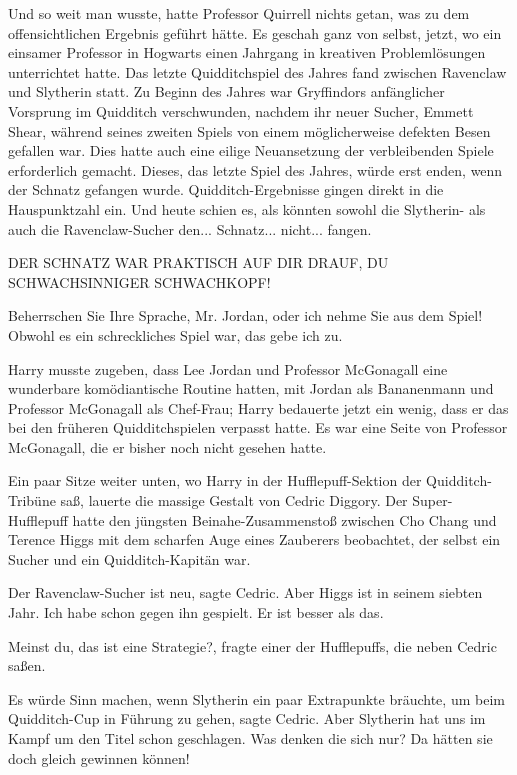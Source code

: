 Und so weit man wusste, hatte Professor Quirrell nichts getan, was zu dem
offensichtlichen Ergebnis geführt hätte. Es geschah ganz von selbst, jetzt, wo
ein einsamer Professor in Hogwarts einen Jahrgang in kreativen Problemlösungen
unterrichtet hatte. Das letzte Quidditchspiel des Jahres fand zwischen Ravenclaw
und Slytherin statt. Zu Beginn des Jahres war Gryffindors anfänglicher Vorsprung
im Quidditch verschwunden, nachdem ihr neuer Sucher, Emmett Shear, während
seines zweiten Spiels von einem möglicherweise defekten Besen gefallen war. Dies
hatte auch eine eilige Neuansetzung der verbleibenden Spiele erforderlich
gemacht. Dieses, das letzte Spiel des Jahres, würde erst enden, wenn der Schnatz
gefangen wurde. Quidditch-Ergebnisse gingen direkt in die Hauspunktzahl ein. Und
heute schien es, als könnten sowohl die Slytherin- als auch die Ravenclaw-Sucher
den... Schnatz... nicht... fangen.

\glqq{}DER SCHNATZ WAR PRAKTISCH AUF DIR DRAUF, DU SCHWACHSINNIGER SCHWACHKOPF!\grqq{}

\glqq{}Beherrschen Sie Ihre Sprache, Mr. Jordan, oder ich nehme Sie aus dem
Spiel! Obwohl es ein schreckliches Spiel war, das gebe ich zu.\grqq{}

Harry musste zugeben, dass Lee Jordan und Professor McGonagall eine wunderbare
komödiantische Routine hatten, mit Jordan als Bananenmann und Professor
McGonagall als Chef-Frau; Harry bedauerte jetzt ein wenig, dass er das bei den
früheren Quidditchspielen verpasst hatte. Es war eine Seite von Professor
McGonagall, die er bisher noch nicht gesehen hatte.

Ein paar Sitze weiter unten, wo Harry in der Hufflepuff-Sektion der
Quidditch-Tribüne saß, lauerte die massige Gestalt von Cedric Diggory. Der
Super-Hufflepuff hatte den jüngsten Beinahe-Zusammenstoß zwischen Cho Chang und
Terence Higgs mit dem scharfen Auge eines Zauberers beobachtet, der selbst ein
Sucher und ein Quidditch-Kapitän war.

\glqq{}Der Ravenclaw-Sucher ist neu\grqq{}, sagte Cedric. \glqq{}Aber Higgs ist in
seinem siebten Jahr. Ich habe schon gegen ihn gespielt. Er ist besser als das.\grqq{}

\glqq{}Meinst du, das ist eine Strategie?\grqq{}, fragte einer der Hufflepuffs,
die neben Cedric saßen.

\glqq{}Es würde Sinn machen, wenn Slytherin ein paar Extrapunkte bräuchte, um
beim Quidditch-Cup in Führung zu gehen\grqq{}, sagte Cedric. \glqq{}Aber
Slytherin hat uns im Kampf um den Titel schon geschlagen. Was denken die sich
nur? Da hätten sie doch gleich gewinnen können!\grqq{}

